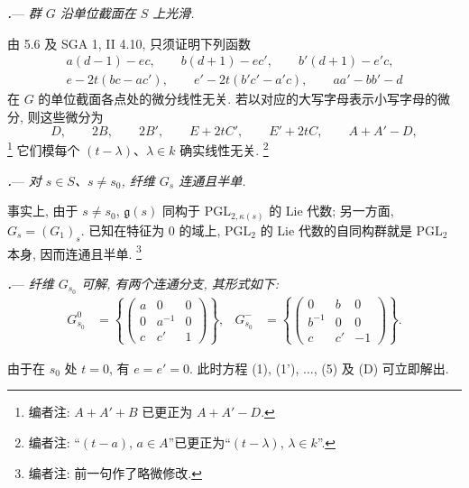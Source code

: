 \par\medskip\noindent
{}\textbf{\textit{.}}---
\textit{群 \(G\) 沿单位截面在 \(S\) 上光滑.}

由 5.6 及 SGA 1, II 4.10, 只须证明下列函数
\[
\begin{gathered}
  a(d-1)-ec,\qquad
  b(d+1)-ec',\qquad
  b'(d+1)-e'c,\\
  e-2t(bc-ac'),\qquad
  e'-2t(b'c'-a'c),\qquad
  aa'-bb'-d
\end{gathered}
\]
在 \(G\) 的单位截面各点处的微分线性无关. 若以对应的大写字母表示小写字母的微分, 则这些微分为
\[
  D,\qquad
  2B,\qquad
  2B',\qquad
  E+2tC',\qquad
  E'+2tC,\qquad
  A+A'-D,
\]
\footnote{编者注: \(A+A'+B\) 已更正为 \(A+A'-D\).}
它们模每个 \((t-\lambda)\)、\(\lambda\in k\) 确实线性无关.
\footnote{编者注: “\((t-a)\), \(a\in A\)”已更正为“\((t-\lambda)\), \(\lambda\in k\)”.}

\par\medskip\noindent
\textbf{\textit{.}}---
\textit{对 \(s\in S\)、\(s\ne s_0\), 纤维 \(G_s\) 连通且半单.}

事实上, 由于 \(s\ne s_0\), \(\mathfrak g(s)\) 同构于 \(\mathrm{PGL}_{2,\kappa(s)}\) 的 Lie 代数; 另一方面, \(G_s=(G_1)_s\). 已知在特征为 \(0\) 的域上, \(\mathrm{PGL}_2\) 的 Lie 代数的自同构群就是 \(\mathrm{PGL}_2\) 本身, 因而连通且半单.
\footnote{编者注: 前一句作了略微修改.}

\par\medskip\noindent
\textbf{\textit{.}}---
\textit{纤维 \(G_{s_0}\) 可解, 有两个连通分支, 其形式如下:}
\[
\begin{aligned}
  G^0_{s_0}
  &=
  \left\{
  \begin{pmatrix}
    a&0&0\\
    0&a^{-1}&0\\
    c&c'&1
  \end{pmatrix}
  \right\},
  &
  G^-_{s_0}
  &=
  \left\{
  \begin{pmatrix}
    0&b&0\\
    b^{-1}&0&0\\
    c&c'&-1
  \end{pmatrix}
  \right\}.
\end{aligned}
\]

由于在 \(s_0\) 处 \(t=0\), 有 \(e=e'=0\). 此时方程 \textup{(1)}, \textup{(1')}, \(\ldots\), \textup{(5)} 及 \textup{(D)} 可立即解出.

